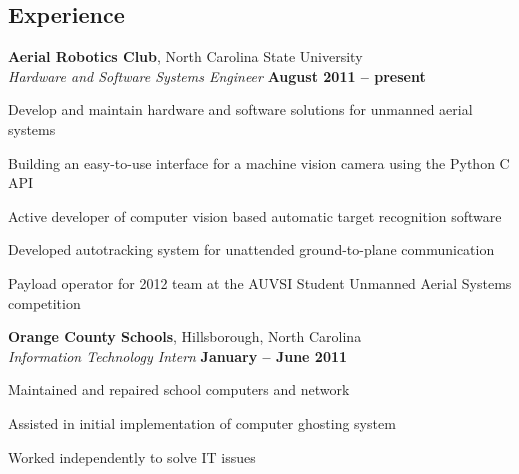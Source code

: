 \documentclass[margin,line,letterpaper]{resume}
\begin{document}
\begin{resume}
    \section{\mysidestyle Experience}

    \textbf{Aerial Robotics Club}, North Carolina State University \vspace{2mm}\\\vspace{1mm}%
    \textsl{Hardware and Software Systems Engineer} \hfill \textbf{August 2011 -- present}\vspace{-3mm}\\\vspace{-1mm}%
    \begin{list2}
    \item Develop and maintain hardware and software solutions for unmanned aerial systems
    \item Building an easy-to-use interface for a machine vision camera using the Python C API
    \item Active developer of computer vision based automatic target recognition software
    \item Developed autotracking system for unattended ground-to-plane communication
    \item Payload operator for 2012 team at the AUVSI Student Unmanned Aerial Systems competition
    \end{list2}\vspace{-1.5mm}

    \textbf{Orange County Schools}, Hillsborough, North Carolina \vspace{2mm}\\\vspace{1mm}%
    \textsl{Information Technology Intern} \hfill \textbf{January -- June 2011}\vspace{-3mm}\\\vspace{-1mm}%
    \begin{list2}
    \item Maintained and repaired school computers and network
    \item Assisted in initial implementation of computer ghosting system 
    \item Worked independently to solve IT issues
    \end{list2}\vspace{-1.5mm}


\end{resume}
\end{document}

